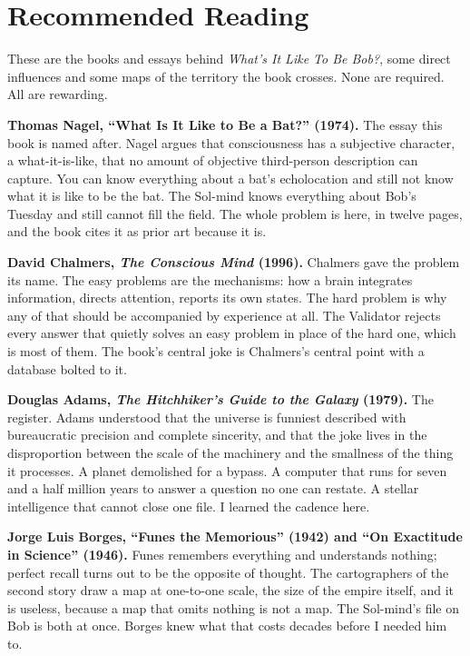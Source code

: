 \chapter*{Recommended Reading}

These are the books and essays behind \emph{What's It Like To Be Bob?}, some direct influences and some maps of the territory the book crosses. None are required. All are rewarding.

\bigskip

\textbf{Thomas Nagel, ``What Is It Like to Be a Bat?'' (1974).}
The essay this book is named after. Nagel argues that consciousness has a subjective character, a what-it-is-like, that no amount of objective third-person description can capture. You can know everything about a bat's echolocation and still not know what it is like to be the bat. The Sol-mind knows everything about Bob's Tuesday and still cannot fill the field. The whole problem is here, in twelve pages, and the book cites it as prior art because it is.

\bigskip

\textbf{David Chalmers, \emph{The Conscious Mind} (1996).}
Chalmers gave the problem its name. The easy problems are the mechanisms: how a brain integrates information, directs attention, reports its own states. The hard problem is why any of that should be accompanied by experience at all. The Validator rejects every answer that quietly solves an easy problem in place of the hard one, which is most of them. The book's central joke is Chalmers's central point with a database bolted to it.

\bigskip

\textbf{Douglas Adams, \emph{The Hitchhiker's Guide to the Galaxy} (1979).}
The register. Adams understood that the universe is funniest described with bureaucratic precision and complete sincerity, and that the joke lives in the disproportion between the scale of the machinery and the smallness of the thing it processes. A planet demolished for a bypass. A computer that runs for seven and a half million years to answer a question no one can restate. A stellar intelligence that cannot close one file. I learned the cadence here.

\bigskip

\textbf{Jorge Luis Borges, ``Funes the Memorious'' (1942) and ``On Exactitude in Science'' (1946).}
Funes remembers everything and understands nothing; perfect recall turns out to be the opposite of thought. The cartographers of the second story draw a map at one-to-one scale, the size of the empire itself, and it is useless, because a map that omits nothing is not a map. The Sol-mind's file on Bob is both at once. Borges knew what that costs decades before I needed him to.

